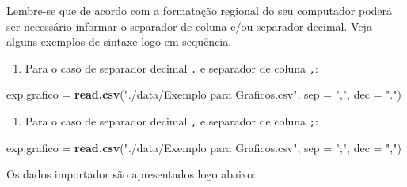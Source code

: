 \documentclass[
]{article}
\newenvironment{Shaded}{\begin{snugshade}}{\end{snugshade}}
\newcommand{\DataTypeTok}[1]{\textcolor[rgb]{0.13,0.29,0.53}{#1}}
\newcommand{\KeywordTok}[1]{\textcolor[rgb]{0.13,0.29,0.53}{\textbf{#1}}}
\newcommand{\NormalTok}[1]{#1}
\newcommand{\StringTok}[1]{\textcolor[rgb]{0.31,0.60,0.02}{#1}}
\providecommand{\tightlist}{%
  \setlength{\itemsep}{0pt}\setlength{\parskip}{0pt}}
\begin{document}
Lembre-se que de acordo com a formatação regional do seu computador poderá ser necessário informar o separador de coluna e/ou separador decimal. Veja alguns exemplos de sintaxe logo em sequência.

\begin{enumerate}
\def\labelenumi{\arabic{enumi}.}
\tightlist
\item
  Para o caso de separador decimal \texttt{.} e separador de coluna \texttt{,}:
\end{enumerate}

\begin{Shaded}
\begin{Highlighting}[]
\NormalTok{exp.grafico =}\StringTok{ }\KeywordTok{read.csv}\NormalTok{(}\StringTok{"./data/Exemplo para Graficos.csv"}\NormalTok{, }\DataTypeTok{sep =} \StringTok{","}\NormalTok{, }\DataTypeTok{dec =} \StringTok{"."}\NormalTok{)}
\end{Highlighting}
\end{Shaded}

\begin{enumerate}
\def\labelenumi{\arabic{enumi}.}
\setcounter{enumi}{1}
\tightlist
\item
  Para o caso de separador decimal \texttt{,} e separador de coluna \texttt{;}:
\end{enumerate}

\begin{Shaded}
\begin{Highlighting}[]
\NormalTok{exp.grafico =}\StringTok{ }\KeywordTok{read.csv}\NormalTok{(}\StringTok{"./data/Exemplo para Graficos.csv"}\NormalTok{, }\DataTypeTok{sep =} \StringTok{";"}\NormalTok{, }\DataTypeTok{dec =} \StringTok{","}\NormalTok{)}
\end{Highlighting}
\end{Shaded}

Os dados importador são apresentados logo abaixo:
\end{document}
